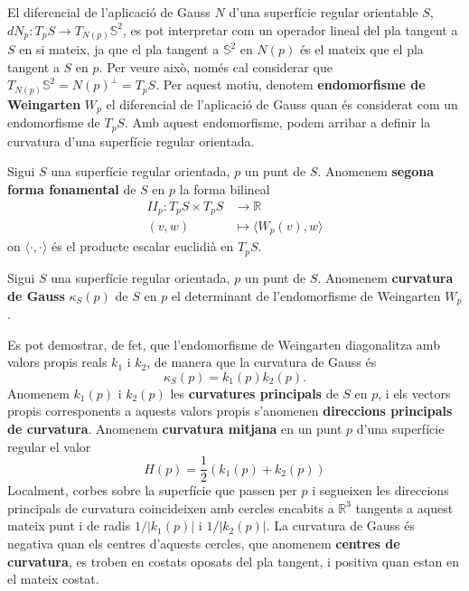 El diferencial de l'aplicació de Gauss $N$ d'una superfície regular orientable $S$, $dN_p:T_pS\to T_{N(p)}\mathbb S^2$, es pot interpretar com un operador lineal del pla tangent a $S$ en si mateix, ja que el pla tangent a $\mathbb S^2$ en $N(p)$ és el mateix que el pla tangent a $S$ en $p$. Per veure això, només cal considerar que $T_{N(p)}\mathbb S^2 = N(p)^\perp = T_pS$. Per aquest motiu, denotem \textbf{endomorfisme de Weingarten} $W_p$ el diferencial de l'aplicació de Gauss quan és considerat com un endomorfisme de $T_pS$. Amb aquest endomorfisme, podem arribar a definir la curvatura d'una superfície regular orientada.

\begin{defi}
    Sigui $S$ una superfície regular orientada, $p$ un punt de $S$. Anomenem \textbf{segona forma fonamental} de $S$ en $p$ la forma bilineal
    \begin{align*}
        II_p:T_pS\times T_pS&\to\mathbb R\\
        (v,w)&\mapsto \langle W_p(v),w\rangle
    \end{align*}
    on $\langle\cdot,\cdot\rangle$ és el producte escalar euclidià en $T_pS$.
\end{defi}

\begin{defi}
    Sigui $S$ una superfície regular orientada, $p$ un punt de $S$. Anomenem \textbf{curvatura de Gauss} $\kappa_S(p)$ de $S$ en $p$ el determinant de l'endomorfisme de Weingarten $W_p$.
\end{defi}

Es pot demostrar, de fet, que l'endomorfisme de Weingarten diagonalitza amb valors propis reals $k_1$ i $k_2$, de manera que la curvatura de Gauss és
\begin{equation*}
    \kappa_S(p) = k_1(p)k_2(p).
\end{equation*}
Anomenem $k_1(p)$ i $k_2(p)$ les \textbf{curvatures principals} de $S$ en $p$, i els vectors propis corresponents a aquests valors propis s'anomenen \textbf{direccions principals de curvatura}. 
Anomenem \textbf{curvatura mitjana} en un punt $p$ d'una superfície regular el valor
\begin{equation}\label{eq:curvatura_mitjana}
    H(p) = \frac12 (k_1(p) + k_2(p))
\end{equation}
Localment, corbes sobre la superfície que passen per $p$ i segueixen les direccions principals de curvatura coincideixen amb cercles encabits a $\mathbb R^3$ tangents a aquest mateix punt i de radis $1/|k_1(p)|$ i $1/|k_2(p)|$.  La curvatura de Gauss és negativa quan els centres d'aquests cercles, que anomenem \textbf{centres de curvatura}, es troben en costats oposats del pla tangent, i positiva quan estan en el mateix costat.

